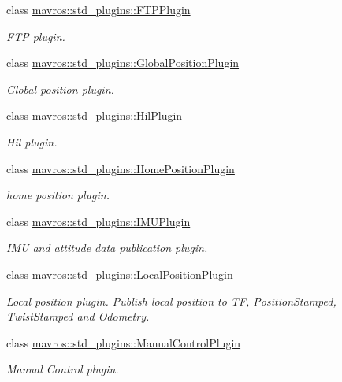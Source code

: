 \begin{DoxyCompactItemize}
class \mbox{\hyperlink{classmavros_1_1std__plugins_1_1FTPPlugin}{mavros\+::std\+\_\+plugins\+::\+F\+T\+P\+Plugin}}
\begin{DoxyCompactList}\small\item\em F\+TP plugin. \end{DoxyCompactList}\item 
class \mbox{\hyperlink{classmavros_1_1std__plugins_1_1GlobalPositionPlugin}{mavros\+::std\+\_\+plugins\+::\+Global\+Position\+Plugin}}
\begin{DoxyCompactList}\small\item\em Global position plugin. \end{DoxyCompactList}\item 
class \mbox{\hyperlink{classmavros_1_1std__plugins_1_1HilPlugin}{mavros\+::std\+\_\+plugins\+::\+Hil\+Plugin}}
\begin{DoxyCompactList}\small\item\em Hil plugin. \end{DoxyCompactList}\item 
class \mbox{\hyperlink{classmavros_1_1std__plugins_1_1HomePositionPlugin}{mavros\+::std\+\_\+plugins\+::\+Home\+Position\+Plugin}}
\begin{DoxyCompactList}\small\item\em home position plugin. \end{DoxyCompactList}\item 
class \mbox{\hyperlink{classmavros_1_1std__plugins_1_1IMUPlugin}{mavros\+::std\+\_\+plugins\+::\+I\+M\+U\+Plugin}}
\begin{DoxyCompactList}\small\item\em I\+MU and attitude data publication plugin. \end{DoxyCompactList}\item 
class \mbox{\hyperlink{classmavros_1_1std__plugins_1_1LocalPositionPlugin}{mavros\+::std\+\_\+plugins\+::\+Local\+Position\+Plugin}}
\begin{DoxyCompactList}\small\item\em Local position plugin. Publish local position to TF, Position\+Stamped, Twist\+Stamped and Odometry. \end{DoxyCompactList}\item 
class \mbox{\hyperlink{classmavros_1_1std__plugins_1_1ManualControlPlugin}{mavros\+::std\+\_\+plugins\+::\+Manual\+Control\+Plugin}}
\begin{DoxyCompactList}\small\item\em Manual Control plugin. \end{DoxyCompactList}\item 

\end{DoxyCompactItemize}
